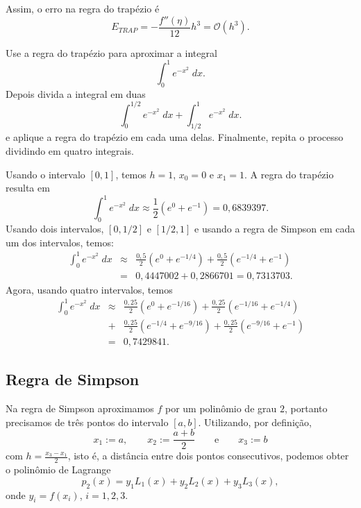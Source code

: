 Assim, o erro na regra do trapézio é
\begin{equation}
E_{TRAP}  = -\frac{f''(\eta)}{12}h^3 = \mathcal{O}(h^3).
\end{equation}

\begin{ex}
Use a regra do trapézio para aproximar a integral
\begin{equation}
\int_0^1e^{-x^2}\;dx.
\end{equation}
Depois divida a integral em duas
\begin{equation}
\int_0^{1/2}e^{-x^2}\;dx+\int_{1/2}^{1}e^{-x^2}\;dx.
\end{equation}
e aplique a regra do trapézio em cada uma delas. Finalmente, repita o processo dividindo em quatro integrais.
\end{ex}
Usando o intervalo $[0,1]$, temos $h=1$, $x_0=0$ e $x_1=1$. A regra do trapézio resulta em
\begin{equation}
\int_0^1e^{-x^2}\;dx\approx \frac{1}{2}(e^{0}+e^{-1})=0,6839397.
\end{equation}
Usando dois intervalos, $[0,1/2]$ e $[1/2,1]$ e usando a regra de Simpson em cada um dos intervalos, temos:
\begin{eqnarray}
\int_0^1e^{-x^2}\;dx &\approx& \frac{0,5}{2}\left(e^{0}+e^{-1/4}\right) + \frac{0,5}{2}\left(e^{-1/4}+e^{-1}\right) \\
&=& 0,4447002+0,2866701 =0,7313703.
\end{eqnarray}
Agora, usando quatro intervalos, temos
\begin{eqnarray}
\int_0^1e^{-x^2}\;dx &\approx& \frac{0,25}{2}\left(e^{0}+e^{-1/16}\right) + \frac{0,25}{2}\left(e^{-1/16}+e^{-1/4}\right) \\
&+& \frac{0,25}{2}\left(e^{-1/4}+e^{-9/16}\right)+\frac{0,25}{2}\left(e^{-9/16}+e^{-1}\right) \\
&=& 0,7429841.
\end{eqnarray}



\subsection{Regra de Simpson}
Na regra de Simpson aproximamos $f$ por um polinômio de grau $2$, portanto precisamos de três pontos do intervalo $[a,b]$. Utilizando, por definição,
\begin{equation}
x_1:=a,\qquad x_2:=\frac{a+b}{2}\qquad \text{e}\qquad x_3:=b
\end{equation}
com $h=\frac{x_3-x_1}{2}$, isto é, a distância entre dois pontos consecutivos, podemos obter o polinômio de Lagrange
\begin{equation}
    p_2(x) = y_1L_1(x) + y_2L_2(x)  + y_3L_3(x),
\end{equation}
onde $y_i=f(x_i)$, $i=1,2,3$.

